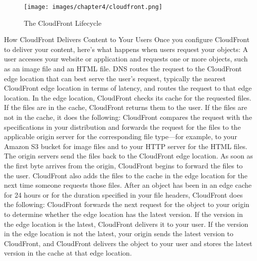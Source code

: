 \begin{figure}[htb] %
 \centering
 \texttt{[image: images/chapter4/cloudfront.png]}\hfill
 \caption[The CloudFront Lifecycle]{The CloudFront Lifecycle}
 \label{fig:fourV}
\end{figure}



How CloudFront Delivers Content to Your Users
Once you configure CloudFront to deliver your content, here's what happens when users request your objects:
A user accesses your website or application and requests one or more objects, such as an image file and an HTML file.
DNS routes the request to the CloudFront edge location that can best serve the user's request, typically the nearest CloudFront edge location in terms of latency, and routes the request to that edge location.
In the edge location, CloudFront checks its cache for the requested files. If the files are in the cache, CloudFront returns them to the user. If the files are not in the cache, it does the following:
CloudFront compares the request with the specifications in your distribution and forwards the request for the files to the applicable origin server for the corresponding file type—for example, to your Amazon S3 bucket for image files and to your HTTP server for the HTML files.
The origin servers send the files back to the CloudFront edge location.
As soon as the first byte arrives from the origin, CloudFront begins to forward the files to the user. CloudFront also adds the files to the cache in the edge location for the next time someone requests those files.
After an object has been in an edge cache for 24 hours or for the duration specified in your file headers, CloudFront does the following:
CloudFront forwards the next request for the object to your origin to determine whether the edge location has the latest version.
If the version in the edge location is the latest, CloudFront delivers it to your user.
If the version in the edge location is not the latest, your origin sends the latest version to CloudFront, and CloudFront delivers the object to your user and stores the latest version in the cache at that edge location.